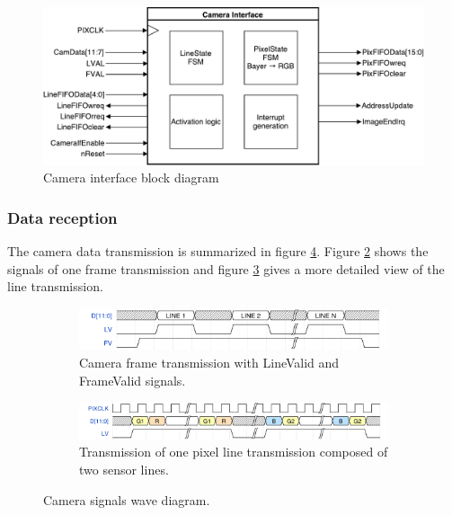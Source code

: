 \documentclass{article}
\begin{document}
\begin{figure}[H]
\centering
\includegraphics[width=\textwidth]{images/CameraInterface.pdf}
\caption{Camera interface block diagram}
\label{fig:camera_interface}
\end{figure}

\subsubsection{Data reception}

The camera data transmission is summarized in figure \ref{fig:camera_signals}. Figure \ref{fig:image_transmission} shows the signals of one frame transmission and figure \ref{fig:line_transmission} gives a more detailed view of the line transmission.

\begin{figure}[H]
\begin{subfigure}[b]{\textwidth}
\centering
\includegraphics[width=\textwidth]{images/image_transmission.png}
\caption{Camera frame transmission with LineValid and FrameValid signals.}
\label{fig:image_transmission}
\end{subfigure}

\begin{subfigure}[b]{\textwidth}
\centering
\includegraphics[width=\textwidth]{images/line_transmission.png}
\caption{Transmission of one pixel line transmission composed of two sensor lines.}
\label{fig:line_transmission}
\end{subfigure}
\caption{Camera signals wave diagram.}
\label{fig:camera_signals}
\end{figure}
\end{document}
